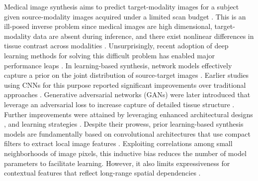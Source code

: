 \documentclass[journal,twoside,web]{ieeecolor}
\begin{document}
\par
Medical image synthesis aims to predict target-modality images for a subject given source-modality images acquired under a limited scan budget \cite{farsiu2004}. This is an ill-posed inverse problem since medical images are high dimensional, target-modality data are absent during inference, and there exist nonlinear differences in tissue contrast across modalities \cite{ye2013,catana2010,lee2017,roy2013,huang2017,huang2018}. Unsurprisingly, recent adoption of deep learning methods for solving this difficult problem has enabled major performance leaps \cite{zhao2017,jog2017,hien2015,vemulapalli2015,wu2016,alexander2014,huynh2015,coupe2013}. In learning-based synthesis, network models effectively capture a prior on the joint distribution of source-target images \cite{sevetlidis2016,chartsias2018,pgan}. Earlier studies using CNNs for this purpose reported significant improvements over traditional approaches \cite{bowles2016,chartsias2018,cordier2016,sevetlidis2016,joyce2017,wei2019}. Generative adversarial networks (GANs) were later introduced that leverage an adversarial loss to increase capture of detailed tissue structure \cite{gan,beers2018,pgan,yu2018,nie2018,armanious2019,lee2019,li2019}. Further improvements were attained by leveraging enhanced architectural designs \cite{zhou2020,lan2020,yurt2021mustgan,yang2021}, and learning strategies \cite{yu2019,mmgan,wang2020}. Despite their prowess, prior learning-based synthesis models are fundamentally based on convolutional architectures that use compact filters to extract local image features \cite{pix2pix,cyclegan}. Exploiting correlations among small neighborhoods of image pixels, this inductive bias reduces the number of model parameters to facilitate learning. However, it also limits expressiveness for contextual features that reflect long-range spatial dependencies \cite{wang2018nonlocal,kodali2018}.
\end{document}
